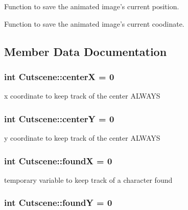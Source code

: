 Function to save the animated image's current position. 

Function to save the animated image's current coodinate. 

\subsection{Member Data Documentation}
\hypertarget{classCutscene_a70148f85e3ef15175751eeb5e92fb870}{
\subsubsection[{center\-X}]{\setlength{\rightskip}{0pt plus 5cm}int Cutscene\-::center\-X = 0\hspace{0.3cm}{\ttfamily [private]}}}\label{classCutscene_a70148f85e3ef15175751eeb5e92fb870}


x coordinate to keep track of the center A\-L\-W\-A\-Y\-S 

\hypertarget{classCutscene_a471290d79d01f029ad56bdfa7472ce40}{
\subsubsection[{center\-Y}]{\setlength{\rightskip}{0pt plus 5cm}int Cutscene\-::center\-Y = 0\hspace{0.3cm}{\ttfamily [private]}}}\label{classCutscene_a471290d79d01f029ad56bdfa7472ce40}


y coordinate to keep track of the center A\-L\-W\-A\-Y\-S 

\hypertarget{classCutscene_a829a69db5263fd8e0915a9b905c386d0}{
\subsubsection[{found\-X}]{\setlength{\rightskip}{0pt plus 5cm}int Cutscene\-::found\-X = 0\hspace{0.3cm}{\ttfamily [private]}}}\label{classCutscene_a829a69db5263fd8e0915a9b905c386d0}


temporary variable to keep track of a character found 

\hypertarget{classCutscene_ac77c836201afb1a31547c6c930e323d4}{
\subsubsection[{found\-Y}]{\setlength{\rightskip}{0pt plus 5cm}int Cutscene\-::found\-Y = 0\hspace{0.3cm}{\ttfamily [private]}}}\label{classCutscene_ac77c836201afb1a31547c6c930e323d4}


